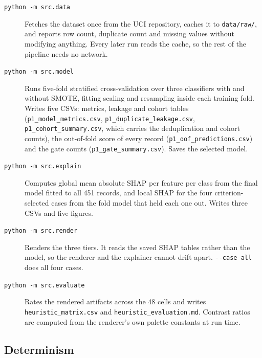 \begin{description}
  \item[\texttt{python -m src.data}] Fetches the dataset once from the UCI
    repository, caches it to \texttt{data/raw/}, and reports row count,
    duplicate count and missing values without modifying anything. Every
    later run reads the cache, so the rest of the pipeline needs no network.
  \item[\texttt{python -m src.model}] Runs five-fold stratified
    cross-validation over three classifiers with and without SMOTE, fitting
    scaling and resampling inside each training fold. Writes five CSVs: metrics,
    leakage and cohort tables (\texttt{p1\_model\_metrics.csv},
    \texttt{p1\_duplicate\_leakage.csv}, \texttt{p1\_cohort\_summary.csv},
    which carries the deduplication and cohort counts), the out-of-fold
    score of every record (\texttt{p1\_oof\_predictions.csv}) and the gate
    counts (\texttt{p1\_gate\_summary.csv}). Saves the selected model.
  \item[\texttt{python -m src.explain}] Computes global mean absolute SHAP
    per feature per class from the final model fitted to all 451 records, and
    local SHAP for the four criterion-selected cases from the fold model that
    held each one out. Writes three CSVs and five figures.
  \item[\texttt{python -m src.render}] Renders the three tiers. It reads the
    saved SHAP tables rather than the model, so the renderer and the
    explainer cannot drift apart. \texttt{-{}-case all} does all four cases.
  \item[\texttt{python -m src.evaluate}] Rates the rendered artifacts across
    the 48 cells and writes \texttt{heuristic\_matrix.csv} and
    \texttt{heuristic\_evaluation.md}. Contrast ratios are computed from the
    renderer's own palette constants at run time.
\end{description}

\subsection{Determinism}


